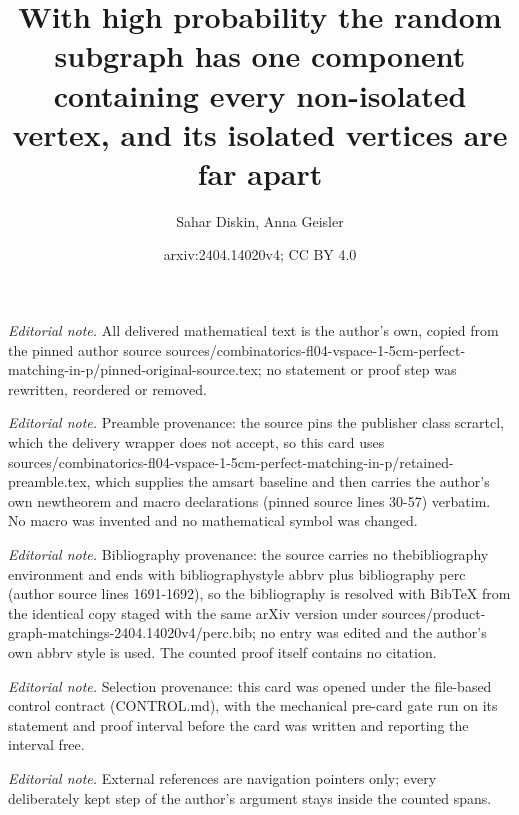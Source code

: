 \documentclass[10pt,a4paper]{amsart}
\title{With high probability the random subgraph has one component containing every non-isolated vertex, and its isolated vertices are far apart}
\author{Sahar Diskin, Anna Geisler}
\date{arxiv:2404.14020v4; CC BY 4.0}
\begin{document}
\maketitle
\noindent\textit{Editorial note.} All delivered mathematical text is the author's own, copied from the pinned author source sources/combinatorics-fl04-vspace-1-5cm-perfect-matching-in-p/pinned-original-source.tex; no statement or proof step was rewritten, reordered or removed.\par\medskip
\noindent\textit{Editorial note.} Preamble provenance: the source pins the publisher class scrartcl, which the delivery wrapper does not accept, so this card uses sources/combinatorics-fl04-vspace-1-5cm-perfect-matching-in-p/retained-preamble.tex, which supplies the amsart baseline and then carries the author's own newtheorem and macro declarations (pinned source lines 30-57) verbatim. No macro was invented and no mathematical symbol was changed.\par\medskip
\noindent\textit{Editorial note.} Bibliography provenance: the source carries no thebibliography environment and ends with bibliographystyle abbrv plus bibliography perc (author source lines 1691-1692), so the bibliography is resolved with BibTeX from the identical copy staged with the same arXiv version under sources/product-graph-matchings-2404.14020v4/perc.bib; no entry was edited and the author's own abbrv style is used. The counted proof itself contains no citation.\par\medskip
\noindent\textit{Editorial note.} Selection provenance: this card was opened under the file-based control contract (CONTROL.md), with the mechanical pre-card gate run on its statement and proof interval before the card was written and reporting the interval free.\par\medskip
\noindent\textit{Editorial note.} External references are navigation pointers only; every deliberately kept step of the author's argument stays inside the counted spans.\par\medskip
\end{document}
